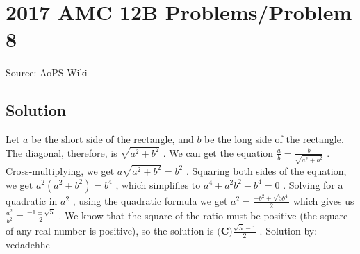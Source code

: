 \documentclass[12pt]{article}
\begin{document}
\section*{{2017 AMC 12B Problems/Problem 8}}
Source: AoPS Wiki

\subsection*{Solution}
Let $a$ be the short side of the rectangle, and $b$ be the long side of the rectangle. The diagonal, therefore, is $\sqrt{a^2 + b^2}$ . We can get the equation $\frac{a}{b} = \frac{b}{\sqrt{a^2 + b^2}}$ . Cross-multiplying, we get $a\sqrt{a^2 + b^2} = b^2$ . Squaring both sides of the equation, we get $a^2 (a^2 + b^2) = b^4$ , which simplifies to $a^4 + a^2b^2 - b^4 = 0$ . Solving for a quadratic in $a^2$ , using the quadratic formula we get $a^2 = \frac{-b^2 \pm \sqrt{5b^4}}{2}$ which gives us $\frac{a^2}{b^2} = \frac{-1 \pm \sqrt{5}}{2}$ . We know that the square of the ratio must be positive (the square of any real number is positive), so the solution is $\boxed{\textbf{(C)} \frac{\sqrt{5}-1}{2}}$ . Solution by: vedadehhc
\end{document}
